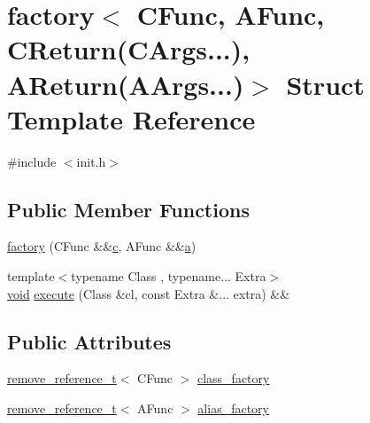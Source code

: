 \hypertarget{structfactory_3_01_c_func_00_01_a_func_00_01_c_return_07_c_args_8_8_8_08_00_01_a_return_07_a_args_8_8_8_08_4}{}\section{factory$<$ C\+Func, A\+Func, C\+Return(C\+Args...), A\+Return(A\+Args...)$>$ Struct Template Reference}
\label{structfactory_3_01_c_func_00_01_a_func_00_01_c_return_07_c_args_8_8_8_08_00_01_a_return_07_a_args_8_8_8_08_4}


{\ttfamily \#include $<$init.\+h$>$}

\subsection*{Public Member Functions}
\begin{DoxyCompactItemize}
\item 
\mbox{\hyperlink{structfactory_3_01_c_func_00_01_a_func_00_01_c_return_07_c_args_8_8_8_08_00_01_a_return_07_a_args_8_8_8_08_4_a16b3bfa2fce30d8e6eaf70fa01303646}{factory}} (C\+Func \&\&\mbox{\hyperlink{_s_d_l__opengl__glext_8h_a1f2d7f8147412c43ba2303a56f97ee73}{c}}, A\+Func \&\&\mbox{\hyperlink{_s_d_l__opengl__glext_8h_a3309789fc188587d666cda5ece79cf82}{a}})
\item 
{\footnotesize template$<$typename Class , typename... Extra$>$ }\\\mbox{\hyperlink{_s_d_l__opengles2__gl2ext_8h_ae5d8fa23ad07c48bb609509eae494c95}{void}} \mbox{\hyperlink{structfactory_3_01_c_func_00_01_a_func_00_01_c_return_07_c_args_8_8_8_08_00_01_a_return_07_a_args_8_8_8_08_4_abc2803b2d240ccb0886bf18ea5dbfadc}{execute}} (Class \&cl, const Extra \&... extra) \&\&
\end{DoxyCompactItemize}
\subsection*{Public Attributes}
\begin{DoxyCompactItemize}
\item 
\mbox{\hyperlink{detail_2common_8h_a3a08cea569e6926ac8d7d74dd7178b5f}{remove\+\_\+reference\+\_\+t}}$<$ C\+Func $>$ \mbox{\hyperlink{structfactory_3_01_c_func_00_01_a_func_00_01_c_return_07_c_args_8_8_8_08_00_01_a_return_07_a_args_8_8_8_08_4_a1034d2e4f9cab5cac4ff96128f5e0399}{class\+\_\+factory}}
\item 
\mbox{\hyperlink{detail_2common_8h_a3a08cea569e6926ac8d7d74dd7178b5f}{remove\+\_\+reference\+\_\+t}}$<$ A\+Func $>$ \mbox{\hyperlink{structfactory_3_01_c_func_00_01_a_func_00_01_c_return_07_c_args_8_8_8_08_00_01_a_return_07_a_args_8_8_8_08_4_a0d8b35371ba301a36acaec41240a2def}{alias\+\_\+factory}}
\end{DoxyCompactItemize}


